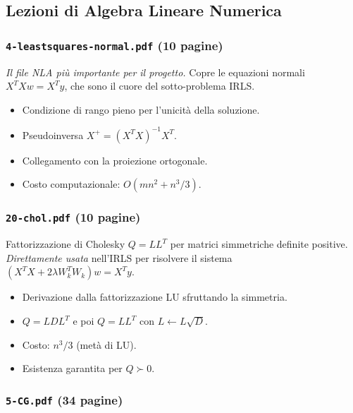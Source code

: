 \documentclass[a4paper,11pt]{article}
\theoremstyle{definition}
\begin{document}
\subsection{Lezioni di Algebra Lineare Numerica}

\subsubsection*{ \quad \texttt{4-leastsquares-normal.pdf} (10 pagine)}

\emph{Il file NLA più importante per il progetto.} Copre le equazioni normali $X^TX w = X^Ty$, che sono il cuore del sotto-problema IRLS.

\begin{itemize}
  \item Condizione di rango pieno per l'unicità della soluzione.
  \item Pseudoinversa $X^+ = (X^TX)^{-1}X^T$.
  \item Collegamento con la proiezione ortogonale.
  \item Costo computazionale: $O(mn^2 + n^3/3)$.
\end{itemize}

\subsubsection*{ \quad \texttt{20-chol.pdf} (10 pagine)}

Fattorizzazione di Cholesky $Q = LL^T$ per matrici simmetriche definite positive. \emph{Direttamente usata} nell'IRLS per risolvere il sistema $(X^TX + 2\lambda W_k^TW_k)w = X^Ty$.

\begin{itemize}
  \item Derivazione dalla fattorizzazione LU sfruttando la simmetria.
  \item $Q = LDL^T$ e poi $Q = LL^T$ con $L \leftarrow L\sqrt{D}$.
  \item Costo: $n^3/3$ (metà di LU).
  \item Esistenza garantita per $Q \succ 0$.
\end{itemize}

\subsubsection*{ \quad \texttt{5-CG.pdf} (34 pagine)}
\end{document}
